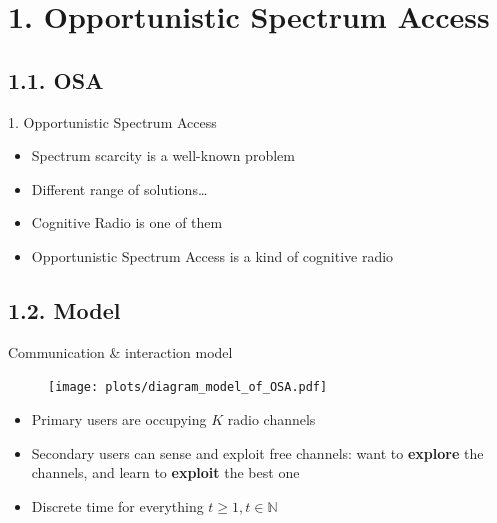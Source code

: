 \documentclass[12pt,english,ignorenonframetext,]{beamer}
\providecommand{\tightlist}{%
  \setlength{\itemsep}{0pt}\setlength{\parskip}{0pt}}
\begin{document}
\section{\hfill{}1. Opportunistic Spectrum Access\hfill{}}

\subsection{\hfill{}1.1. OSA\hfill{}}

\begin{frame}{%
\protect\hypertarget{opportunistic-spectrum-access}{%
1. Opportunistic Spectrum Access}}

\begin{itemize}
\tightlist
\item
  Spectrum scarcity is a well-known problem
\item
  Different range of solutions\ldots{}
\item
  Cognitive Radio is one of them
\item
  Opportunistic Spectrum Access is a kind of cognitive radio
\end{itemize}

\end{frame}



\subsection{\hfill{}1.2. Model\hfill{}}

\begin{frame}{%
\protect\hypertarget{communication-interaction-model}{%
Communication \& interaction model}}

\begin{figure}
  \centering
  \texttt{[image: plots/diagram\_model\_of\_OSA.pdf]}
\end{figure}

\begin{itemize}
\tightlist
\item
  Primary users are occupying \(K\) radio channels
\item
  Secondary users can sense and exploit free channels: want to
  \textbf{explore} the channels, and learn to \textbf{exploit} the best
  one
\item
  Discrete time for everything \(t\geq1,t\in\mathbb{N}\)
\end{itemize}

\end{frame}
\end{document}

